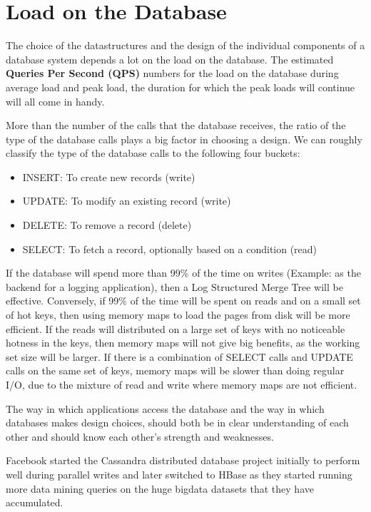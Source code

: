 \section{Load on the Database}

The choice of the datastructures and the design of the individual components of a database system depends a lot on the load on the database. The estimated \textbf{Queries Per Second (QPS)} numbers for the load on the database during average load and peak load, the duration for which the peak loads will continue will all come in handy.

More than the number of the calls that the database receives, the ratio of the type of the database calls plays a big factor in choosing a design. We can roughly classify the type of the database calls to the following four buckets:
\begin{itemize}
\item INSERT: To create new records (write)
\item UPDATE: To modify an existing record (write)
\item DELETE: To remove a record (delete)
\item SELECT: To fetch a record, optionally based on a condition (read)
\end{itemize}

If the database will spend more than 99\% of the time on writes (Example: as the backend for a logging application), then a Log Structured Merge Tree \cite{O_Neil_1996} will be effective. Conversely, if 99\% of the time will be spent on reads and on a small set of hot keys, then using memory maps to load the pages from disk will be more efficient. If the reads will distributed on a large set of keys with no noticeable hotness in the keys, then memory maps will not give big benefits, as the working set size will be larger. If there is a combination of SELECT calls and UPDATE calls on the same set of keys, memory maps will be slower than doing regular I/O, due to the mixture of read and write where memory maps are not efficient.

The way in which applications access the database and the way in which databases makes design choices, should both be in clear understanding of each other and should know each other's strength and weaknesses.

Facebook started the Cassandra\cite{Lakshman_2009} distributed database project initially to perform well during parallel writes and later switched to HBase as they started running more data mining queries on the huge bigdata datasets that they have accumulated.